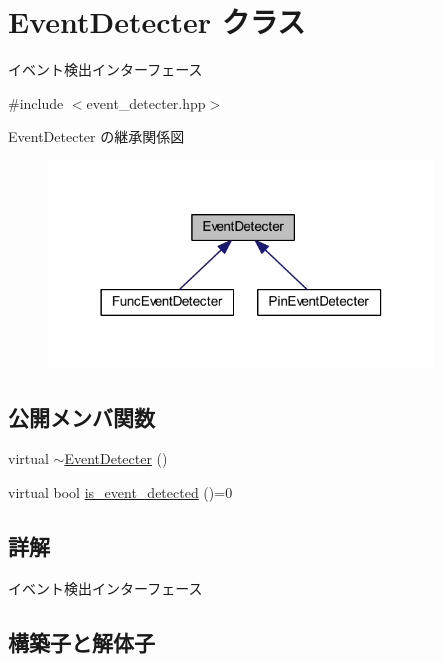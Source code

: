 \hypertarget{class_event_detecter}{}\section{Event\+Detecter クラス}
\label{class_event_detecter}


イベント検出インターフェース  




{\ttfamily \#include $<$event\+\_\+detecter.\+hpp$>$}



Event\+Detecter の継承関係図\nopagebreak
\begin{figure}[H]
\begin{center}
\leavevmode
\includegraphics[width=290pt]{class_event_detecter__inherit__graph}
\end{center}
\end{figure}
\subsection*{公開メンバ関数}
\begin{DoxyCompactItemize}
\item 
virtual \mbox{\hyperlink{class_event_detecter_a773bd1560f0c7ceb26f2919c485a6737}{$\sim$\+Event\+Detecter}} ()
\item 
virtual bool \mbox{\hyperlink{class_event_detecter_ae5f2c62e1226dcd9434eef3db92a8a70}{is\+\_\+event\+\_\+detected}} ()=0
\end{DoxyCompactItemize}


\subsection{詳解}
イベント検出インターフェース 

\subsection{構築子と解体子}
\mbox{\label{class_event_detecter_a773bd1560f0c7ceb26f2919c485a6737}} 

